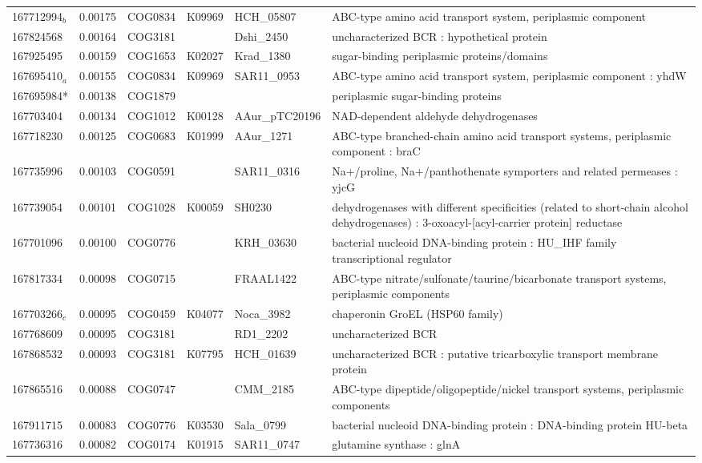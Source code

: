 \begin{landscape}
\begin{longtable}{p{1.6cm}p{1.2cm}p{1.5cm}p{1.5cm}p{2.8cm}p{13.5cm}}
167712994$_b$ & 0.00175 & COG0834 & K09969 & HCH\_05807 & ABC-type amino acid transport system,  periplasmic component \\
167824568 & 0.00164 & COG3181 &  & Dshi\_2450 & uncharacterized BCR : hypothetical protein \\
167925495 & 0.00159 & COG1653 & K02027 & Krad\_1380 & sugar-binding periplasmic proteins/domains \\
167695410$_a$ & 0.00155 & COG0834 & K09969 & SAR11\_0953 & ABC-type amino acid transport system,  periplasmic component : yhdW \\
167695984* & 0.00138 & COG1879 &  &  & periplasmic sugar-binding proteins \\
167703404 & 0.00134 & COG1012 & K00128 & AAur\_pTC20196 & NAD-dependent aldehyde dehydrogenases \\
167718230 & 0.00125 & COG0683 & K01999 & AAur\_1271 & ABC-type branched-chain amino acid transport systems,  periplasmic component : braC \\
167735996 & 0.00103 & COG0591 &  & SAR11\_0316 & Na$+$/proline,  Na$+$/panthothenate symporters and related permeases : yjcG \\
167739054 & 0.00101 & COG1028 & K00059 & SH0230 & dehydrogenases with different specificities (related to short-chain alcohol dehydrogenases) : 3-oxoacyl-[acyl-carrier protein] reductase \\
167701096 & 0.00100 & COG0776 &  & KRH\_03630 & bacterial nucleoid DNA-binding protein : HU\_IHF family transcriptional regulator \\
167817334 & 0.00098 & COG0715 &  & FRAAL1422 & ABC-type nitrate/sulfonate/taurine/bicarbonate transport systems,  periplasmic components \\
167703266$_c$ & 0.00095 & COG0459 & K04077 & Noca\_3982 & chaperonin GroEL (HSP60 family) \\
167768609 & 0.00095 & COG3181 &  & RD1\_2202 & uncharacterized BCR \\
167868532 & 0.00093 & COG3181 & K07795 & HCH\_01639 & uncharacterized BCR : putative tricarboxylic transport membrane protein \\
167865516 & 0.00088 & COG0747 &  & CMM\_2185 & ABC-type dipeptide/oligopeptide/nickel transport systems,  periplasmic components \\
167911715 & 0.00083 & COG0776 & K03530 & Sala\_0799 & bacterial nucleoid DNA-binding protein : DNA-binding protein HU-beta \\
167736316 & 0.00082 & COG0174 & K01915 & SAR11\_0747 & glutamine synthase : glnA \\

\end{longtable}
\end{landscape}
